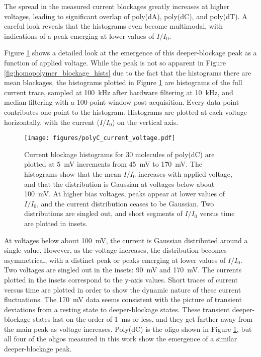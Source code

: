 The spread in the measured current blockages greatly increases at higher voltages, leading to significant overlap of poly(dA), poly(dC), and poly(dT).  A careful look reveals that the histograms even become multimodal, with indications of a peak emerging at lower values of $I/I_0$.

Figure \ref{fig:polyC_hists} shows a detailed look at the emergence of this deeper-blockage peak as a function of applied voltage.  While the peak is not so apparent in Figure \ref{fig:homopolymer_blockage_hists} due to the fact that the histograms there are mean blockages, the histograms plotted in Figure \ref{fig:polyC_hists} are histograms of the full current trace, sampled at \SI{100}{\kHz} after hardware filtering at \SI{10}{\kHz}, and median filtering with a 100-point window post-acquisition.  Every data point contributes one point to the histogram.  Histograms are plotted at each voltage horizontally, with the current ($I/I_0$) on the vertical axis.

\begin{figure}[h]
\begin{centering}
\texttt{[image: figures/polyC\_current\_voltage.pdf]}
\caption[Current histograms for poly(dC) ssDNA versus voltage]{Current blockage histograms for \num{30} molecules of poly(dC) are plotted at \SI{5}{\mV} increments from \SI{45}{\mV} to \SI{170}{\mV}.  The histograms show that the mean $I/I_0$ increases with applied voltage, and that the distribution is Gaussian at voltages below about \SI{100}{\mV}.  At higher bias voltages, peaks appear at lower values of $I/I_0$, and the current distribution ceases to be Gaussian.  Two distributions are singled out, and short segments of $I/I_0$ versus time are plotted in insets.}
\label{fig:polyC_hists}
\end{centering}
\end{figure}

At voltages below about \SI{100}{\mV}, the current is Gaussian distributed around a single value.  However, as the voltage increases, the distribution becomes asymmetrical, with a distinct peak or peaks emerging at lower values of $I/I_0$.  Two voltages are singled out in the insets: \SI{90}{\mV} and \SI{170}{\mV}.  The currents plotted in the insets correspond to the y-axis values.  Short traces of current versus time are plotted in order to show the dynamic nature of these current fluctuations.  The \SI{170}{\mV} data seems consistent with the picture of transient deviations from a resting state to deeper-blockage states.  These transient deeper-blockage states last on the order of \SI{1}{\ms} or less, and they get farther away from the main peak as voltage increases.  Poly(dC) is the oligo shown in Figure \ref{fig:polyC_hists}, but all four of the oligos measured in this work show the emergence of a similar deeper-blockage peak.

